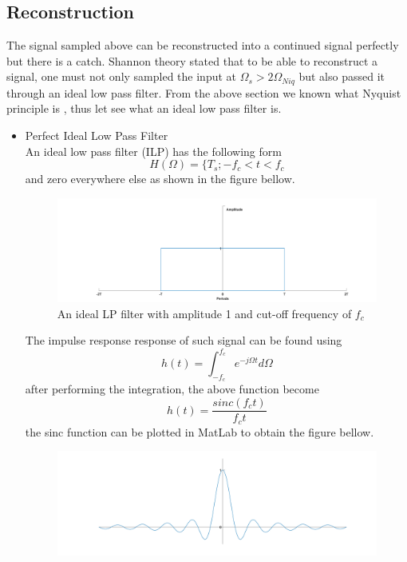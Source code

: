 \documentclass[12pt,letterpaper]{article}
\begin{document}
\subsection*{Reconstruction}
The signal sampled above can be reconstructed into a continued signal perfectly but there is a catch. Shannon 
theory stated that to be able to reconstruct a signal, one must not only sampled the input at \(\Omega_s > 2\Omega_{Niq}\)
but also passed it through an ideal low pass filter. From the above section we known what Nyquist principle is 
, thus let see what an ideal low pass filter is.\\
\begin{itemize}
    \item Perfect Ideal Low Pass Filter \\
    An ideal low pass filter (ILP) has the following form\\
    \begin{equation}
        H(\Omega)=\{T_s; -f_{c}<t<f_c
    \end{equation}
    and zero everywhere else as shown in the figure bellow.
    \begin{figure}[h]
        \centering
            \includegraphics[width=15cm]{Lowpass.jpg}
            \caption{An ideal LP filter with amplitude 1 and cut-off frequency of \(f_c\)}
    \end{figure}
    The impulse response response of such signal can be found using
    \begin{equation}
        h(t)=\int_{-f_{c}}^{f_c}e^{-j\Omega t}d\Omega
    \end{equation}
    after performing the integration, the above function become 
    \begin{equation}
        h(t)=\frac{sinc(f_{c}t)}{f_{c}t} 
    \end{equation}
    the sinc function can be plotted in MatLab to obtain the figure bellow.
    \begin{figure}[h]
        \centering
            \includegraphics[width=15cm]{sinc.jpg}

\end{figure}
\end{itemize}
\end{document}
